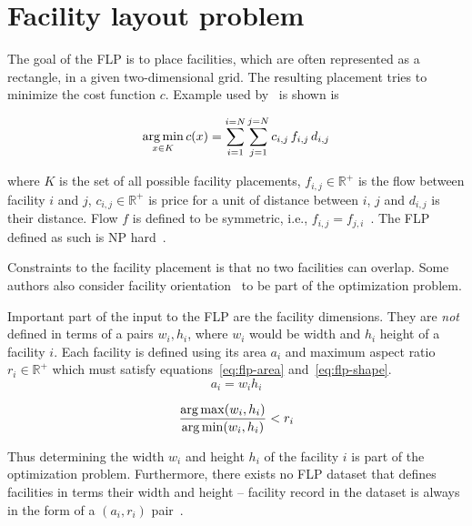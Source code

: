 \section{Facility layout problem}\label{sec:facility-layout-problem}

The goal of the FLP is to place facilities, which are often represented as a rectangle,
in a given two-dimensional grid. The resulting placement tries to minimize
the cost function $c$.
Example used by~\cite{goncalvesBiasedRandomkeyGenetic2015} is shown is

\begin{equation}
    \operatorname*{arg\,min}_{x \in K} c(x) = \sum\limits_{i=1}^{i=N}\sum\limits_{j=1}^{j=N}c_{i,j}\,f_{i,j}\,d_{i,j}
    \label{eq:flp-objective}
\end{equation}

where $K$ is the set of all possible facility placements, $f_{i,j} \in \mathbb{R^+}$ is the flow between facility $i$ and $j$, $c_{i,j} \in \mathbb{R^+}$
is price for a unit of distance between $i$, $j$ and $d_{i,j}$ is their distance.
Flow $f$ is defined to be symmetric, i.e., $f_{i,j} = f_{j,i}$~\cite{goncalvesBiasedRandomkeyGenetic2015, dunkerCoevolutionaryAlgorithmFacility2003}.
The FLP defined as such is NP hard~\cite{liuMultiobjectiveParticleSwarm2018, goncalvesBiasedRandomkeyGenetic2015, friedrichIntegratedSlicingTree2018}.

Constraints to the facility placement is that no two facilities can overlap.
Some authors also consider facility orientation~\cite{liuMultiobjectiveParticleSwarm2018, tamHierarchicalApproachFacility1991}
to be part of the optimization problem.

Important part of the input to the FLP are the facility dimensions.
They are \textit{not} defined in terms of a pairs $w_i, h_i$, where $w_i$ would be width and $h_i$ height of a facility $i$.
Each facility is defined using its area $a_i$ and maximum aspect ratio $r_i \in \mathbb{R^+}$ which must satisfy equations~\ref{eq:flp-area} and~\ref{eq:flp-shape}.
\begin{equation}
    a_i = w_i h_i
    \label{eq:flp-area}
\end{equation}

\begin{equation}
    \dfrac{\operatorname*{arg\,max}(w_i, h_i)}{\operatorname*{arg\,min}(w_i, h_i)} < r_i
    \label{eq:flp-shape}
\end{equation}

Thus determining the width $w_i$ and height $h_i$ of the facility $i$ is part of the optimization problem.
Furthermore, there exists no FLP dataset that defines facilities in terms their width and height
– facility record in the dataset is always in the form of a $(a_i, r_i)$ pair~\cite{tamHierarchicalApproachFacility1991, dunkerCoevolutionaryAlgorithmFacility2003, liuSequencepairRepresentationMIPmodelbased2007}.

